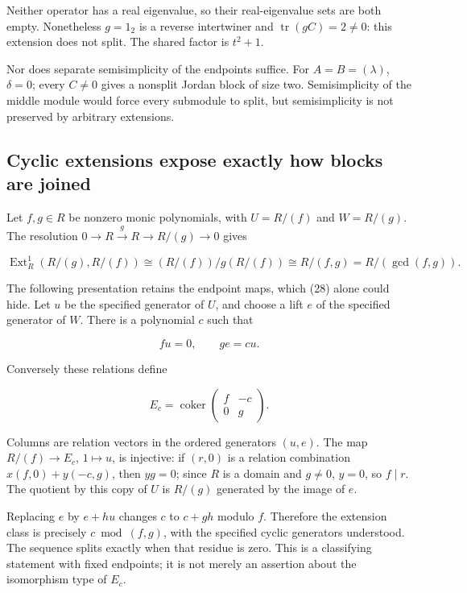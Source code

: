 \documentclass[
  11pt,
]{article}
\begin{document}
Neither operator has a real eigenvalue, so their real-eigenvalue sets
are both empty. Nonetheless \(g=1_2\) is a reverse intertwiner and
\(\operatorname{tr}(gC)=2\ne0\): this extension does not split. The
shared factor is \(t^2+1\).

Nor does separate semisimplicity of the endpoints suffice. For
\(A=B=(\lambda)\), \(\delta=0\); every \(C\ne0\) gives a nonsplit Jordan
block of size two. Semisimplicity of the middle module would force every
submodule to split, but semisimplicity is not preserved by arbitrary
extensions.

\subsection{Cyclic extensions expose exactly how blocks are
joined}\label{cyclic-extensions-expose-exactly-how-blocks-are-joined}

Let \(f,g\in R\) be nonzero monic polynomials, with \(U=R/(f)\) and
\(W=R/(g)\). The resolution \(0\to R\xrightarrow{g}R\to R/(g)\to0\)
gives

\[\operatorname{Ext}^1_R(R/(g),R/(f))
\cong(R/(f))/g(R/(f))
\cong R/(f,g)=R/(\gcd(f,g)).\tag{28}\]

The following presentation retains the endpoint maps, which (28) alone
could hide. Let \(u\) be the specified generator of \(U\), and choose a
lift \(e\) of the specified generator of \(W\). There is a polynomial
\(c\) such that

\[fu=0,\qquad ge=cu.\tag{29}\]

Conversely these relations define

\[E_c=\operatorname{coker}
\begin{pmatrix}f&-c\\0&g\end{pmatrix}.\tag{30}\]

Columns are relation vectors in the ordered generators \((u,e)\). The
map \(R/(f)\to E_c\), \(1\mapsto u\), is injective: if \((r,0)\) is a
relation combination \(x(f,0)+y(-c,g)\), then \(yg=0\); since \(R\) is a
domain and \(g\ne0\), \(y=0\), so \(f\mid r\). The quotient by this copy
of \(U\) is \(R/(g)\) generated by the image of \(e\).

Replacing \(e\) by \(e+hu\) changes \(c\) to \(c+gh\) modulo \(f\).
Therefore the extension class is precisely \(c\bmod(f,g)\), with the
specified cyclic generators understood. The sequence splits exactly when
that residue is zero. This is a classifying statement with fixed
endpoints; it is not merely an assertion about the isomorphism type of
\(E_c\).
\end{document}
